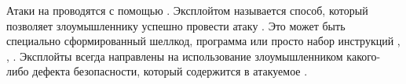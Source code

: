 \Sentence
Атаки на  проводятся с помощью . 
\Sentence
Эксплойтом называется способ, который позволяет злоумышленнику успешно провести атаку 
. 
\Sentence
Это может быть специально сформированный шеллкод, программа или просто набор инструкций 
, , . 
\Sentence
Эксплойты всегда направлены на использование злоумышленником какого-либо дефекта безопасности, 
который содержится в атакуемое . 

